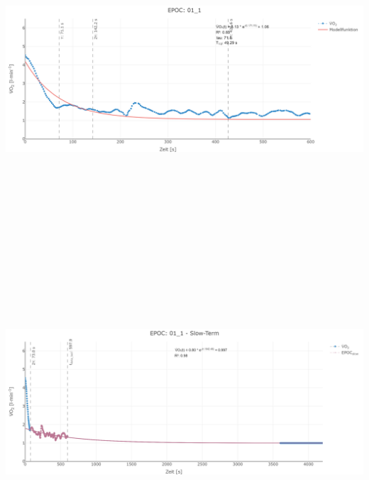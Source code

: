 \documentclass[
  letterpaper,
  DIV=11]{scrartcl}
\begin{document}
\includegraphics[width=11.45833in,height=4.6875in]{images/01_1_tau.png}
\includegraphics[width=11.45833in,height=4.6875in]{images/01_1_slow.png}
\end{document}
